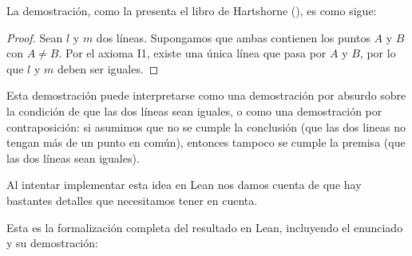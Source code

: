 
La demostración, como la presenta el libro de Hartshorne (), es como
sigue:
\begin{proof}
	Sean $l$ y $m$ dos líneas. Supongamos que ambas contienen los puntos $A$ y
	$B$ con $A\ne B$. Por el axioma I1, existe una única línea que pasa por $A$
	y $B$, por lo que $l$ y $m$ deben ser iguales.
\end{proof}

Esta demostración puede interpretarse como una demostración por absurdo sobre la
condición de que las dos líneas sean iguales, o como una demostración por
contraposición: si asumimos que no se cumple la conclusión (que las dos lineas
no tengan más de un punto en común), entonces tampoco se cumple la premisa (que
las dos líneas sean iguales).


Al intentar implementar esta idea en Lean nos damos cuenta de que hay bastantes
detalles que necesitamos tener en cuenta.

Esta es la formalización completa del resultado en Lean, incluyendo el enunciado
y su demostración:



